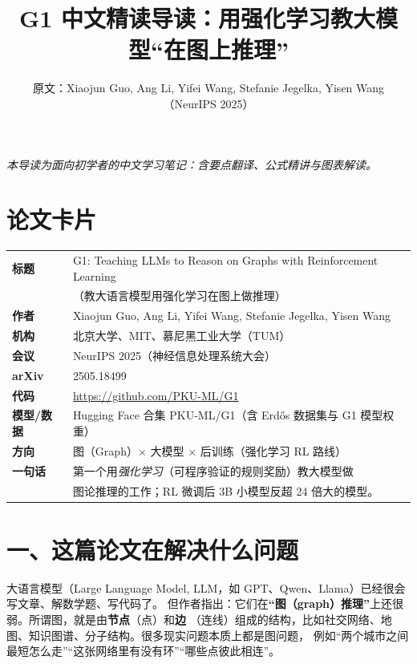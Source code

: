 \documentclass[11pt,UTF8,fontset=fandol]{ctexart}
\title{G1 中文精读导读：用强化学习教大模型“在图上推理”}
\author{原文：Xiaojun Guo, Ang Li, Yifei Wang, Stefanie Jegelka, Yisen Wang（NeurIPS 2025）}
\date{}
\begin{document}
\maketitle
\begin{center}\small\textit{本导读为面向初学者的中文学习笔记：含要点翻译、公式精讲与图表解读。}\end{center}

\section*{论文卡片}
\begin{center}
\begin{tabular}{@{}ll@{}}
\toprule
\textbf{标题} & G1: Teaching LLMs to Reason on Graphs with Reinforcement Learning \\
            & （教大语言模型用强化学习在图上做推理） \\
\textbf{作者} & Xiaojun Guo, Ang Li, Yifei Wang, Stefanie Jegelka, Yisen Wang \\
\textbf{机构} & 北京大学、MIT、慕尼黑工业大学（TUM） \\
\textbf{会议} & NeurIPS 2025（神经信息处理系统大会） \\
\textbf{arXiv} & 2505.18499 \\
\textbf{代码} & \url{https://github.com/PKU-ML/G1} \\
\textbf{模型/数据} & Hugging Face 合集 PKU-ML/G1（含 Erdős 数据集与 G1 模型权重） \\
\textbf{方向} & 图（Graph）$\times$ 大模型 $\times$ 后训练（强化学习 RL 路线） \\
\textbf{一句话} & 第一个用\emph{强化学习}（可程序验证的规则奖励）教大模型做\\
              & 图论推理的工作；RL 微调后 3B 小模型反超 24 倍大的模型。 \\
\bottomrule
\end{tabular}
\end{center}

\section{一、这篇论文在解决什么问题}

大语言模型（Large Language Model, LLM，如 GPT、Qwen、Llama）已经很会写文章、解数学题、写代码了。
但作者指出：它们在\textbf{“图（graph）推理”}上还很弱。所谓图，就是由\textbf{节点}（点）和\textbf{边}
（连线）组成的结构，比如社交网络、地图、知识图谱、分子结构。很多现实问题本质上都是图问题，
例如“两个城市之间最短怎么走”“这张网络里有没有环”“哪些点彼此相连”。
\end{document}

